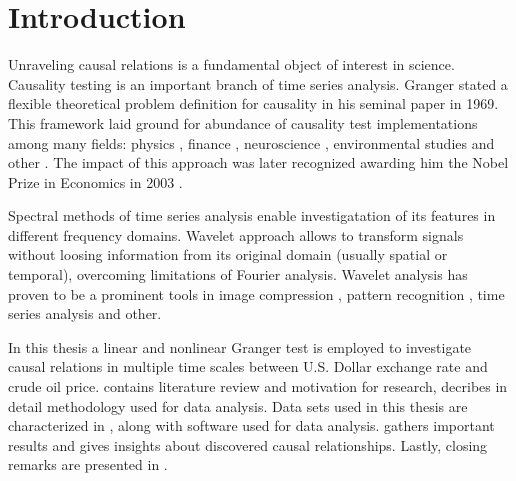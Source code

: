 \section{Introduction}

Unraveling causal relations is a fundamental object of interest in science.
Causality testing is an important branch of time series analysis.
Granger \cite{granger69} stated a flexible theoretical problem definition for causality in his seminal paper in 1969.
This framework laid ground for abundance of causality test implementations among many fields:
physics \cite{inverse-ising,coupled-oscillators},
finance \cite{hiemstra-jones, gold-stock},
neuroscience \cite{Bullmore2009,causality-eeg,causality-visual},
environmental studies \cite{dogan2016co,ecological-economics}
and other \cite{social-media}.
The impact of this approach was later recognized awarding him the Nobel Prize in Economics in 2003 \cite{nobel2003}.

Spectral methods of time series analysis enable investigatation of its features in different frequency domains.
Wavelet approach allows to transform signals without loosing information from its original domain (usually spatial or temporal), overcoming limitations of Fourier analysis.
Wavelet analysis has proven to be a prominent tools in image compression \cite{jpeg2000}, 
pattern recognition \cite{pattern-recognition}, 
time series analysis \cite{multifractal-time-series} 
and other.

In this thesis a linear and nonlinear Granger test is employed to investigate causal relations
in multiple time scales between U.S. Dollar exchange rate and crude oil price.
 contains literature review and motivation for research,
 decribes in detail methodology used for data analysis.
Data sets used in this thesis are characterized in , along with software used for data analysis.
 gathers important results and gives insights about discovered causal relationships.
Lastly, closing remarks are presented in .
